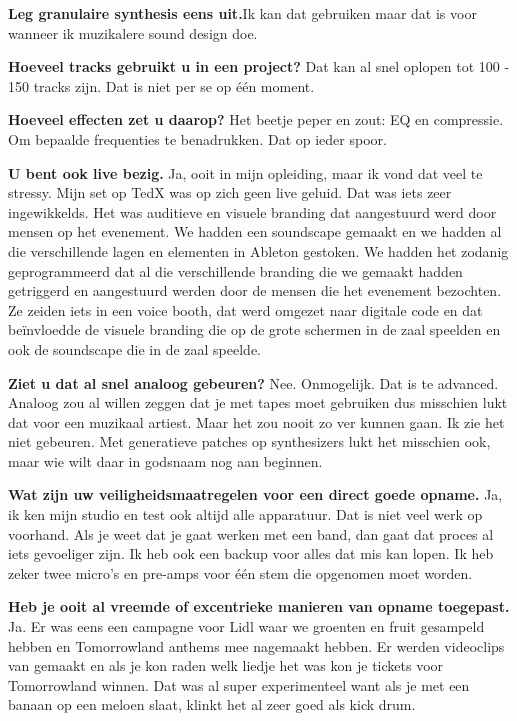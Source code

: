 \textbf{Leg granulaire synthesis eens uit.}
Ik kan dat gebruiken maar dat is voor wanneer ik muzikalere sound design doe.

\textbf{Hoeveel tracks gebruikt u in een project?}\newline
Dat kan al snel oplopen tot 100 - 150 tracks zijn.
Dat is niet per se op één moment.

\textbf{Hoeveel effecten zet u daarop?}\newline
Het beetje peper en zout: EQ en compressie. Om bepaalde frequenties te benadrukken. Dat op ieder spoor.

\textbf{U bent ook live bezig.}\newline
Ja, ooit in mijn opleiding, maar ik vond dat veel te stressy. Mijn set op TedX was op zich geen live geluid. Dat was iets zeer ingewikkelds.
Het was auditieve en visuele branding dat aangestuurd werd door mensen op het evenement.
We hadden een soundscape gemaakt en we hadden al die verschillende lagen en elementen in Ableton gestoken.
We hadden het zodanig geprogrammeerd dat al die verschillende branding die we gemaakt hadden getriggerd en aangestuurd werden door de mensen die het evenement bezochten.
Ze zeiden iets in een voice booth, dat werd omgezet naar digitale code en dat beïnvloedde de visuele branding die op de grote schermen in de zaal speelden en ook de soundscape die in de zaal speelde.

\textbf{Ziet u dat al snel analoog gebeuren?}\newline
Nee. Onmogelijk. Dat is te advanced.
Analoog zou al willen zeggen dat je met tapes moet gebruiken dus misschien lukt dat voor een muzikaal artiest. Maar het zou nooit zo ver kunnen gaan. Ik zie het niet gebeuren.
Met generatieve patches op synthesizers lukt het misschien ook, maar wie wilt daar in godsnaam nog aan beginnen.

\textbf{Wat zijn uw veiligheidsmaatregelen voor een direct goede opname.}\newline
Ja, ik ken mijn studio en test ook altijd alle apparatuur. Dat is niet veel werk op voorhand.
Als je weet dat je gaat werken met een band, dan gaat dat proces al iets gevoeliger zijn.
Ik heb ook een backup voor alles dat mis kan lopen. Ik heb zeker twee micro's en pre-amps voor één stem die opgenomen moet worden.

\textbf{Heb je ooit al vreemde of excentrieke manieren van opname toegepast.}\newline
Ja. Er was eens een campagne voor Lidl waar we groenten en fruit gesampeld hebben en Tomorrowland anthems mee nagemaakt hebben.
Er werden videoclips van gemaakt en als je kon raden welk liedje het was kon je tickets voor Tomorrowland winnen.
Dat was al super experimenteel want als je met een banaan op een meloen slaat, klinkt het al zeer goed als kick drum.

